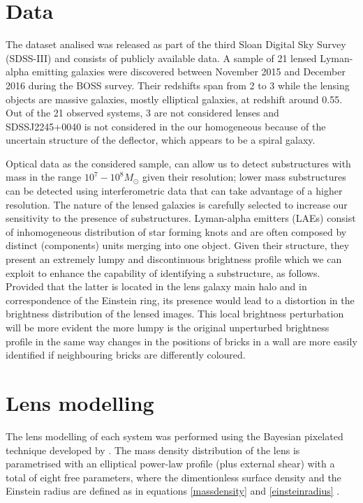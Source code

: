 \documentclass[a4paper,fleqn,usenatbib]{mnras}
\begin{document}
\section{Data}
The dataset analised was released as part of the third Sloan Digital Sky Survey (SDSS-III) and consists of publicly available data. A sample of 21 lensed Lyman-alpha emitting galaxies were discovered between November 2015 and December 2016 during the BOSS survey. Their redshifts span from 2 to 3 while the lensing objects are massive galaxies, mostly elliptical galaxies, at redshift around 0.55. Out of the 21 observed systems, 3 are not considered lenses and SDSSJ2245+0040 is not considered in the our homogeneous because of the uncertain structure of the deflector, which appears to be a spiral galaxy.

Optical data as the considered sample, can allow us to detect substructures with mass in the range $10^7 - 10^8 M_{\odot}$ given their resolution; lower mass substructures can be detected using interferometric data that can take advantage of a higher resolution.
The nature of the lensed galaxies is carefully selected to increase our sensitivity to the presence of substructures. Lyman-alpha emitters (LAEs) consist of inhomogeneous distribution of star forming knots and are often composed by distinct (components) units merging into one object. Given their structure, they present an extremely lumpy and discontinuous brightness profile which we can exploit to enhance the capability of identifying a substructure, as follows. Provided that the latter is located in the lens galaxy main halo and in correspondence of the Einstein ring, its presence would lead to a distortion in the brightness distribution of the lensed images. This local brightness perturbation will be more evident the more lumpy is the original unperturbed brightness profile in the same way changes in the positions of bricks in a wall are more easily identified if neighbouring bricks are differently coloured.

\section{Lens modelling}
The lens modelling of each system was performed using the Bayesian pixelated technique developed by \citet{V09} \citep[see also][]{V14a}.
The mass density distribution of the lens is parametrised with an elliptical power-law profile (plus external shear) with a total of eight free parameters, where the dimentionless surface density and the Einstein radius are defined as in equations \ref{massdensity} and \ref{einsteinradius} \citep[see also][]{Vegetal14}.
\end{document}
